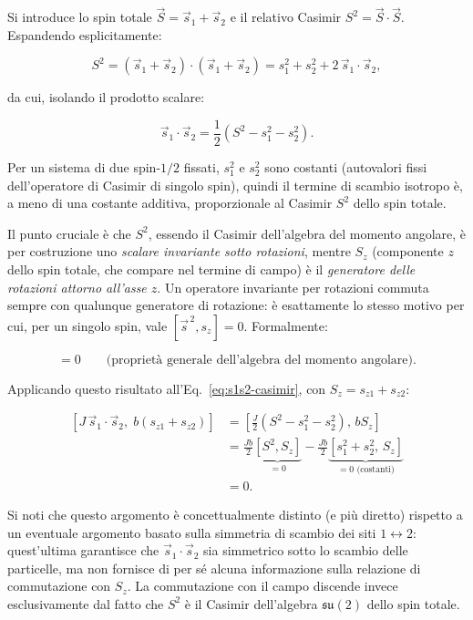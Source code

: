 \documentclass[11pt,a4paper]{article}
\begin{document}
Si introduce lo spin totale $\vec S = \vec s_1+\vec s_2$ e il relativo Casimir $S^2=\vec S\cdot\vec S$. Espandendo esplicitamente:

\begin{equation}
S^2 = (\vec s_1+\vec s_2)\cdot(\vec s_1+\vec s_2) = s_1^2 + s_2^2 + 2\,\vec s_1\cdot\vec s_2,
\end{equation}

da cui, isolando il prodotto scalare:

\begin{equation}
\vec s_1\cdot\vec s_2 = \frac{1}{2}\left(S^2 - s_1^2 - s_2^2\right).
\label{eq:s1s2-casimir}
\end{equation}

Per un sistema di due spin-$1/2$ fissati, $s_1^2$ e $s_2^2$ sono costanti (autovalori fissi dell'operatore di Casimir di singolo spin), quindi il termine di scambio isotropo è, a meno di una costante additiva, proporzionale al Casimir $S^2$ dello spin totale.

Il punto cruciale è che $S^2$, essendo il Casimir dell'algebra del momento angolare, è per costruzione uno \emph{scalare invariante sotto rotazioni}, mentre $S_z$ (componente $z$ dello spin totale, che compare nel termine di campo) è il \emph{generatore delle rotazioni attorno all'asse $z$}. Un operatore invariante per rotazioni commuta sempre con qualunque generatore di rotazione: è esattamente lo stesso motivo per cui, per un singolo spin, vale $[\vec s^{\,2},s_z]=0$. Formalmente:

\begin{equation}
[S^2, S_z] = 0 \qquad \text{(proprietà generale dell'algebra del momento angolare)}.
\end{equation}

Applicando questo risultato all'Eq.~\eqref{eq:s1s2-casimir}, con $S_z=s_{z1}+s_{z2}$:

\begin{align}
\left[J\,\vec s_1\cdot\vec s_2,\; b(s_{z1}+s_{z2})\right] &= \left[\frac{J}{2}\left(S^2-s_1^2-s_2^2\right),\, bS_z\right]\\
&= \frac{Jb}{2}\underbrace{[S^2,S_z]}_{=0} - \frac{Jb}{2}\underbrace{[s_1^2+s_2^2,\,S_z]}_{=0\text{ (costanti)}}\\
&= 0.
\end{align}

Si noti che questo argomento è concettualmente distinto (e più diretto) rispetto a un eventuale argomento basato sulla simmetria di scambio dei siti $1\leftrightarrow 2$: quest'ultima garantisce che $\vec s_1\cdot\vec s_2$ sia simmetrico sotto lo scambio delle particelle, ma non fornisce di per sé alcuna informazione sulla relazione di commutazione con $S_z$. La commutazione con il campo discende invece esclusivamente dal fatto che $S^2$ è il Casimir dell'algebra $\mathfrak{su}(2)$ dello spin totale.
\end{document}
